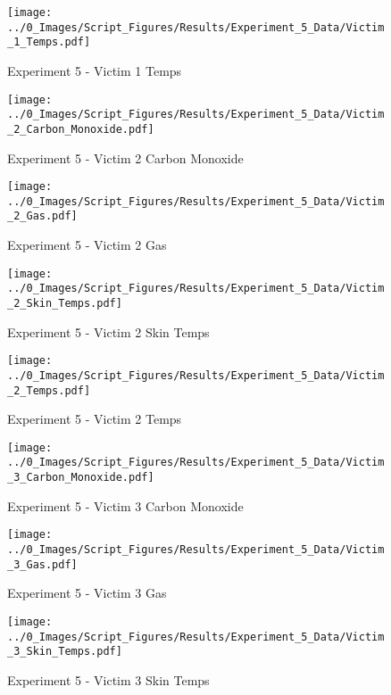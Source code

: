 	\clearpage

	\begin{figure}[H]
		\centering
		\texttt{[image: ../0\_Images/Script\_Figures/Results/Experiment\_5\_Data/Victim\_1\_Temps.pdf]}
		\caption[]{Experiment 5 - Victim 1 Temps}
	\end{figure}
 

	\begin{figure}[H]
		\centering
		\texttt{[image: ../0\_Images/Script\_Figures/Results/Experiment\_5\_Data/Victim\_2\_Carbon\_Monoxide.pdf]}
		\caption[]{Experiment 5 - Victim 2 Carbon Monoxide}
	\end{figure}
 
	\clearpage

	\begin{figure}[H]
		\centering
		\texttt{[image: ../0\_Images/Script\_Figures/Results/Experiment\_5\_Data/Victim\_2\_Gas.pdf]}
		\caption[]{Experiment 5 - Victim 2 Gas}
	\end{figure}
 

	\begin{figure}[H]
		\centering
		\texttt{[image: ../0\_Images/Script\_Figures/Results/Experiment\_5\_Data/Victim\_2\_Skin\_Temps.pdf]}
		\caption[]{Experiment 5 - Victim 2 Skin Temps}
	\end{figure}
 
	\clearpage

	\begin{figure}[H]
		\centering
		\texttt{[image: ../0\_Images/Script\_Figures/Results/Experiment\_5\_Data/Victim\_2\_Temps.pdf]}
		\caption[]{Experiment 5 - Victim 2 Temps}
	\end{figure}
 

	\begin{figure}[H]
		\centering
		\texttt{[image: ../0\_Images/Script\_Figures/Results/Experiment\_5\_Data/Victim\_3\_Carbon\_Monoxide.pdf]}
		\caption[]{Experiment 5 - Victim 3 Carbon Monoxide}
	\end{figure}
 
	\clearpage

	\begin{figure}[H]
		\centering
		\texttt{[image: ../0\_Images/Script\_Figures/Results/Experiment\_5\_Data/Victim\_3\_Gas.pdf]}
		\caption[]{Experiment 5 - Victim 3 Gas}
	\end{figure}
 

	\begin{figure}[H]
		\centering
		\texttt{[image: ../0\_Images/Script\_Figures/Results/Experiment\_5\_Data/Victim\_3\_Skin\_Temps.pdf]}
		\caption[]{Experiment 5 - Victim 3 Skin Temps}
	\end{figure}
 
